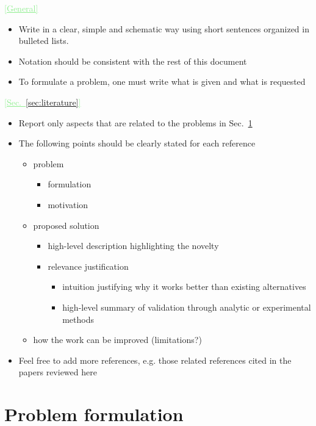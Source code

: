 \documentclass[11pt,final,onecolumn]{IEEEtran}
\newcommand{\cmt}[1]{\noindent\textcolor{lightgreen}{\underline{[#1]}}} %
\newcommand{\cmt}[1]{} %
\begin{document}
 \cmt{General}
  \begin{itemize}
  \item Write in a clear, simple and schematic way using short
    sentences organized in bulleted lists.
  \item Notation should be consistent with the rest of this document
  \item To formulate a problem, one must write what is given and what
    is requested
  \end{itemize}

\cmt{Sec.~\ref{sec:literature}}
  \begin{itemize}
  \item Report only aspects that are
    related to the problems in Sec.~\ref{sec:problem}
  \item The following points should be clearly stated for each
    reference
    \begin{itemize}
    \item problem
      \begin{itemize}
      \item formulation
      \item motivation
      \end{itemize}      
    \item proposed solution
      \begin{itemize}
      \item high-level description highlighting the novelty
      \item relevance justification
        \begin{itemize}
        \item intuition justifying why it works better than existing
          alternatives
        \item high-level summary of validation through analytic or
          experimental methods
        \end{itemize}      
      \end{itemize}
    \item how the work can be improved (limitations?)
    \end{itemize}

  \item Feel free to add more references, e.g. those related
    references cited in the papers reviewed here

  \end{itemize}



\section{Problem formulation}
\label{sec:problem}
\end{document}
